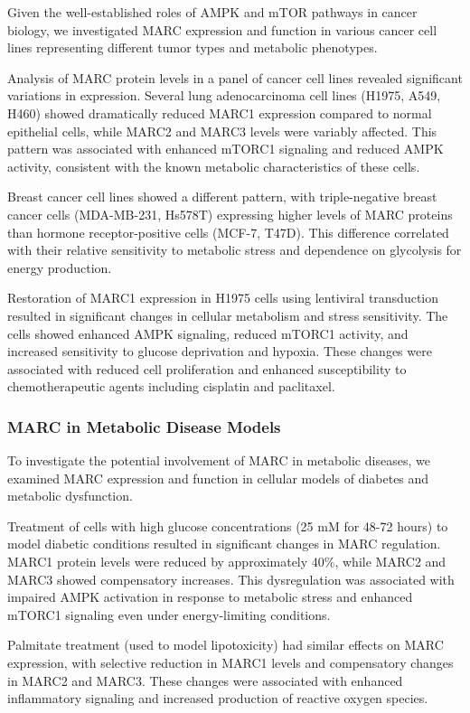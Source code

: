 \documentclass[11pt,a4paper]{article}
\begin{document}
Given the well-established roles of AMPK and mTOR pathways in cancer biology, we investigated MARC expression and function in various cancer cell lines representing different tumor types and metabolic phenotypes.

Analysis of MARC protein levels in a panel of cancer cell lines revealed significant variations in expression. Several lung adenocarcinoma cell lines (H1975, A549, H460) showed dramatically reduced MARC1 expression compared to normal epithelial cells, while MARC2 and MARC3 levels were variably affected. This pattern was associated with enhanced mTORC1 signaling and reduced AMPK activity, consistent with the known metabolic characteristics of these cells.

Breast cancer cell lines showed a different pattern, with triple-negative breast cancer cells (MDA-MB-231, Hs578T) expressing higher levels of MARC proteins than hormone receptor-positive cells (MCF-7, T47D). This difference correlated with their relative sensitivity to metabolic stress and dependence on glycolysis for energy production.

Restoration of MARC1 expression in H1975 cells using lentiviral transduction resulted in significant changes in cellular metabolism and stress sensitivity. The cells showed enhanced AMPK signaling, reduced mTORC1 activity, and increased sensitivity to glucose deprivation and hypoxia. These changes were associated with reduced cell proliferation and enhanced susceptibility to chemotherapeutic agents including cisplatin and paclitaxel.

\subsubsection{MARC in Metabolic Disease Models}

To investigate the potential involvement of MARC in metabolic diseases, we examined MARC expression and function in cellular models of diabetes and metabolic dysfunction.

Treatment of cells with high glucose concentrations (25 mM for 48-72 hours) to model diabetic conditions resulted in significant changes in MARC regulation. MARC1 protein levels were reduced by approximately 40\%, while MARC2 and MARC3 showed compensatory increases. This dysregulation was associated with impaired AMPK activation in response to metabolic stress and enhanced mTORC1 signaling even under energy-limiting conditions.

Palmitate treatment (used to model lipotoxicity) had similar effects on MARC expression, with selective reduction in MARC1 levels and compensatory changes in MARC2 and MARC3. These changes were associated with enhanced inflammatory signaling and increased production of reactive oxygen species.
\end{document}
